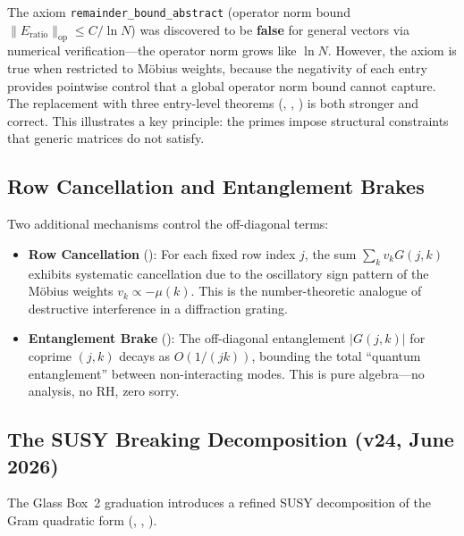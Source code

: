 \begin{remark}
The axiom \texttt{remainder\_bound\_abstract} (operator norm bound
$\|E_{\mathrm{ratio}}\|_{\mathrm{op}} \leq C/\ln N$) was discovered
to be \textbf{false} for general vectors via numerical verification---the
operator norm grows like $\ln N$. However, the axiom is true when
restricted to M\"obius weights, because the negativity of each entry
provides pointwise control that a global operator norm bound cannot
capture. The replacement with three entry-level theorems
(, ,
) is both stronger and correct. This
illustrates a key principle: the primes impose structural constraints
that generic matrices do not satisfy.
\end{remark}

\subsection{Row Cancellation and Entanglement Brakes}

Two additional mechanisms control the off-diagonal terms:

\begin{itemize}
  \item \textbf{Row Cancellation} ():
    For each fixed row index $j$, the sum $\sum_k v_k G(j,k)$
    exhibits systematic cancellation due to the oscillatory sign
    pattern of the M\"obius weights $v_k \propto -\mu(k)$.
    This is the number-theoretic analogue of destructive
    interference in a diffraction grating.

  \item \textbf{Entanglement Brake} ():
    The off-diagonal entanglement $|G(j,k)|$ for coprime $(j,k)$
    decays as $O(1/(jk))$, bounding the total ``quantum entanglement''
    between non-interacting modes. This is pure algebra---no
    analysis, no RH, zero sorry.
\end{itemize}

\subsection{The SUSY Breaking Decomposition (v24, June 2026)}
\label{sec:susy-breaking}

The Glass Box~2 graduation introduces a refined SUSY decomposition
of the Gram quadratic form (,
, ).


